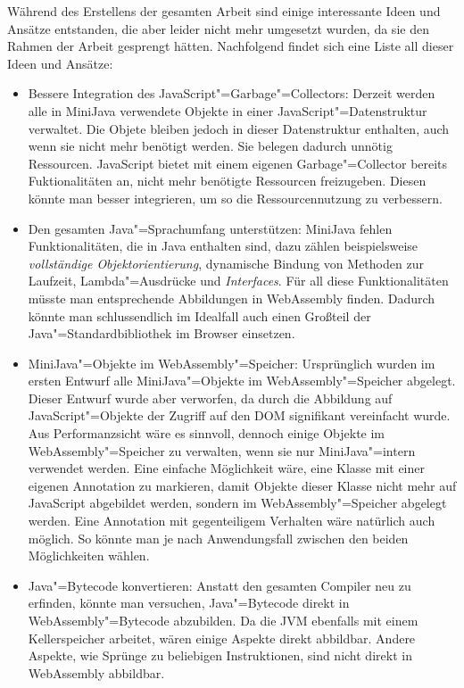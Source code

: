 Während des Erstellens der gesamten Arbeit sind einige interessante Ideen und Ansätze entstanden, die aber leider nicht mehr umgesetzt wurden, da sie den Rahmen der Arbeit gesprengt hätten. Nachfolgend findet sich eine Liste all dieser Ideen und Ansätze:
\begin{itemize}
    \item Bessere Integration des JavaScript"=Garbage"=Collectors: Derzeit werden alle in MiniJava verwendete Objekte in einer JavaScript"=Datenstruktur verwaltet. Die Objete bleiben jedoch in dieser Datenstruktur enthalten, auch wenn sie nicht mehr benötigt werden. Sie belegen dadurch unnötig Ressourcen. JavaScript bietet mit einem eigenen Garbage"=Collector bereits Fuktionalitäten an, nicht mehr benötigte Ressourcen freizugeben. Diesen könnte man besser integrieren, um so die Ressourcennutzung zu verbessern.
    \item Den gesamten Java"=Sprachumfang unterstützen: MiniJava fehlen Funktionalitäten, die in Java enthalten sind, dazu zählen beispielsweise \emph{vollständige Objektorientierung}, dynamische Bindung von Methoden zur Laufzeit, Lambda"=Ausdrücke und \emph{Interfaces}. Für all diese Funktionalitäten müsste man entsprechende Abbildungen in WebAssembly finden. Dadurch könnte man schlussendlich im Idealfall auch einen Großteil der Java"=Standardbibliothek im Browser einsetzen.
    \item MiniJava"=Objekte im WebAssembly"=Speicher: Ursprünglich wurden im ersten Entwurf alle MiniJava"=Objekte im WebAssembly"=Speicher abgelegt. Dieser Entwurf wurde aber verworfen, da durch die Abbildung auf JavaScript"=Objekte der Zugriff auf den DOM signifikant vereinfacht wurde. Aus Performanzsicht wäre es sinnvoll, dennoch einige Objekte im WebAssembly"=Speicher zu verwalten, wenn sie nur MiniJava"=intern verwendet werden. Eine einfache Möglichkeit wäre, eine Klasse mit einer eigenen Annotation zu markieren, damit Objekte dieser Klasse nicht mehr auf JavaScript abgebildet werden, sondern im WebAssembly"=Speicher abgelegt werden. Eine Annotation mit gegenteiligem Verhalten wäre natürlich auch möglich. So könnte man je nach Anwendungsfall zwischen den beiden Möglichkeiten wählen.
    \pagebreak
    \item Java"=Bytecode konvertieren: Anstatt den gesamten Compiler neu zu erfinden, könnte man versuchen, Java"=Bytecode direkt in WebAssembly"=Bytecode abzubilden. Da die JVM ebenfalls mit einem Kellerspeicher arbeitet, wären einige Aspekte direkt abbildbar. Andere Aspekte, wie Sprünge zu beliebigen Instruktionen, sind nicht direkt in WebAssembly abbildbar.

\end{itemize}
